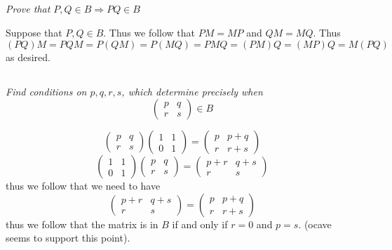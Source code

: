 \documentclass[11pt,oneside,titlepage]{book}
\DeclareMathOperator \ra {\Rightarrow}
\begin{document}
\subsection{}

\textit{Prove that $P, Q \in B \ra PQ \in B$}

Suppose that $P, Q \in B$. Thus we follow that $PM = MP$ and $QM = MQ$. Thus
$$(PQ)M = PQM = P(QM) = P(MQ) = PMQ = (PM)Q = (MP)Q = M(PQ)$$
as desired.

\subsection{}

\textit{Find conditions on $p, q, r, s$, which determine precisely when
$$
\begin{pmatrix}
  p & q \\
  r & s
\end{pmatrix} \in B
$$ }

$$
\begin{pmatrix}
  p & q \\
  r & s
\end{pmatrix}
\begin{pmatrix}
  1 & 1 \\
  0 & 1
\end{pmatrix} =
\begin{pmatrix}
  p & p + q \\
  r & r + s
\end{pmatrix}
$$
$$
\begin{pmatrix}
  1 & 1 \\
  0 & 1
\end{pmatrix}
\begin{pmatrix}
  p & q \\
  r & s
\end{pmatrix} = 
\begin{pmatrix}
  p + r & q + s\\
  r & s
\end{pmatrix}
$$
thus we follow that we need to have
$$
\begin{pmatrix}
  p + r & q + s\\
  r & s
\end{pmatrix} =
\begin{pmatrix}
  p & p + q \\
  r & r + s
\end{pmatrix}
$$
thus we follow that the matrix is in $B$ if and only if $r = 0$ and $p = s$. (ocave seems
to support this point).
\end{document}
